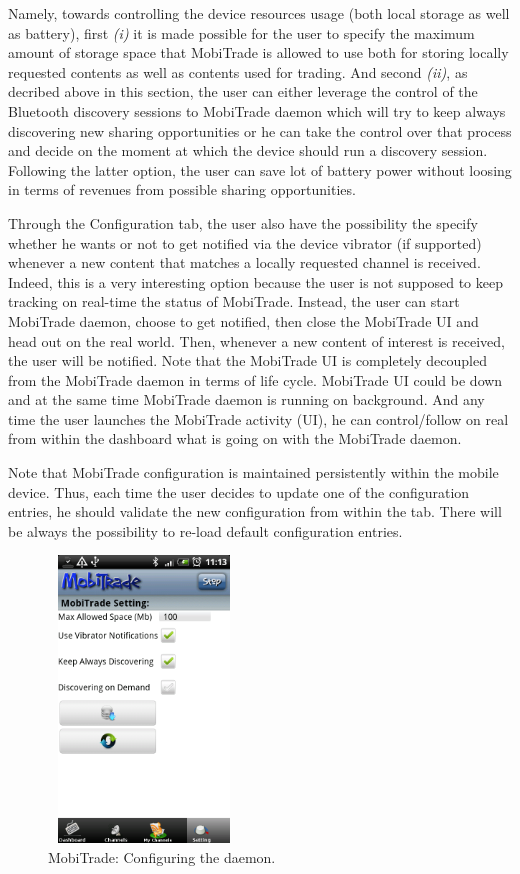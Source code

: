 Namely, towards controlling the device resources usage (both local storage as well as battery), first  \emph{(i)} it is made possible for the user to specify the maximum amount of storage space that MobiTrade is allowed to use both for storing locally requested contents as well as contents used for trading. And second \emph{(ii)}, as decribed above in this section, the user can either leverage the control of the Bluetooth discovery sessions to MobiTrade daemon which will try to keep always discovering new sharing opportunities or he can take the control over that process and decide on the moment at which the device should run a discovery session. Following the latter option, the user can save lot of battery power without loosing in terms of revenues from possible sharing opportunities.

Through the Configuration tab, the user also have the possibility the specify whether he wants or not to get notified via the device vibrator (if supported) whenever a new content that matches a locally requested channel is received. Indeed, this is a very interesting option because the user is not supposed to keep tracking on real-time the status of MobiTrade. Instead, the user can start MobiTrade daemon, choose to get notified, then close the MobiTrade UI and head out on the real world. Then, whenever a new content of interest is received, the user will be notified. Note that the MobiTrade UI is completely decoupled from the MobiTrade daemon in terms of life cycle. MobiTrade UI could be down and at the same time MobiTrade daemon is running on background. And any time the user launches the MobiTrade activity (UI), he can control/follow on real from within the dashboard what is going on with the MobiTrade daemon.

Note that MobiTrade configuration is maintained persistently within the mobile device. Thus, each time the user decides to update one of the configuration entries, he should validate the new configuration from within the tab. There will be always the possibility to re-load default configuration entries.

\begin{figure}[!h]
\begin{center}
\includegraphics[width=2in,height=3in]{Chapitre6/Config.png}
\end{center}
\caption{MobiTrade: Configuring the daemon.}
\label{Config}
\end{figure}


